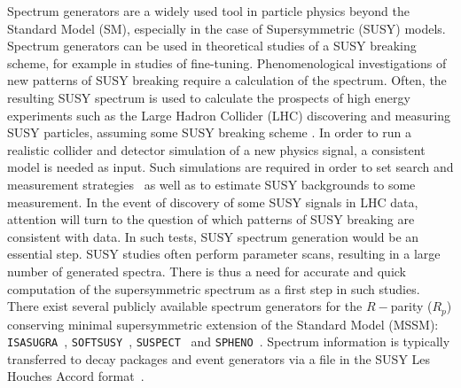 \documentclass[final,3p,times,pdflatex]{elsarticle}
\def\SOFTSUSY{{\tt SOFTSUSY}}
\def\SUSPECT{{\tt SUSPECT}}
\def\SPHENO{{\tt SPHENO}}
\def\ISASUGRA{{\tt ISASUGRA}}
\begin{document}
Spectrum generators are a widely used tool in particle
physics beyond the Standard Model (SM), especially in the case of
Supersymmetric (SUSY) models. 
Spectrum generators can be used in theoretical studies of a SUSY
breaking scheme, for example in studies of fine-tuning. 
Phenomenological investigations of new
patterns of SUSY breaking require a calculation of the spectrum.  
Often, the resulting SUSY spectrum is used to calculate the prospects of high
energy experiments such as the Large Hadron 
Collider (LHC) discovering and measuring SUSY particles, assuming some 
SUSY breaking scheme \cite{Allanach:2008zn}. In order to run a realistic
collider 
and detector simulation of a new physics signal, a consistent model is needed
as input. Such simulations are required in order to set search and measurement
strategies~\cite{Armstrong:1994it,Bayatian:2006zz} as well as to estimate 
SUSY backgrounds to some measurement. 
In the event of discovery of some SUSY signals in LHC data, attention will
turn to the 
question of which patterns of SUSY breaking are consistent with data. 
In such tests, SUSY
spectrum generation would be an essential step.
SUSY studies often perform parameter scans, resulting in a large number of
generated spectra. 
There is  
thus a need for accurate and quick computation of the supersymmetric spectrum
as a first step in such studies. 
There exist several publicly available spectrum generators for
the $R-$parity ($R_p$) conserving minimal
supersymmetric extension of the Standard Model (MSSM):
\ISASUGRA~\cite{Paige:2003mg}, \SOFTSUSY~\cite{Allanach:2001kg}, 
\SUSPECT~\cite{Djouadi:2002ze} and
\SPHENO~\cite{Porod:2003um}. 
Spectrum information is typically
transferred to decay packages and event generators 
via a file in the SUSY Les Houches Accord
format~\cite{Skands:2003cj,Allanach:2008qq}. 
\end{document}
